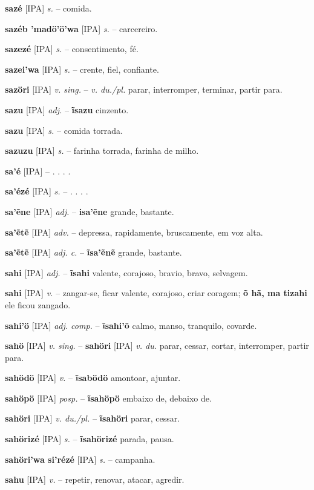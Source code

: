 \textbf{sazé} [IPA] \textit{s.} -- comida.

\textbf{sazéb 'madö'ö'wa} [IPA] \textit{s.} -- carcereiro.

\textbf{sazezé} [IPA] \textit{s.} -- consentimento, fé.

\textbf{sazei'wa} [IPA] \textit{s.} -- crente, fiel, confiante.

\textbf{sazöri} [IPA] \textit{v. sing.} -- \textit{v. du./pl.} parar, interromper, terminar, partir para.

\textbf{sazu} [IPA] \textit{adj.} -- \textbf{ĩsazu} cinzento.

\textbf{sazu} [IPA] \textit{s.} -- comida torrada.

\textbf{sazuzu} [IPA] \textit{s.} -- farinha torrada, farinha de milho.

\textbf{sa'é} [IPA] \textit{} -- . . . .

\textbf{sa'ézé} [IPA] \textit{s.} -- . . . .

\textbf{sa'ẽne} [IPA] \textit{adj.} -- \textbf{isa'ẽne} grande, bastante.

\textbf{sa'ẽtẽ} [IPA] \textit{adv.} -- depressa, rapidamente, bruscamente, em voz alta.

\textbf{sa'ẽtẽ} [IPA] \textit{adj. c.} -- \textbf{ĩsa'ẽnẽ} grande, bastante.

\textbf{sahi} [IPA] \textit{adj.} -- \textbf{ĩsahi} valente, corajoso, bravio, bravo, selvagem.

\textbf{sahi} [IPA] \textit{v.} -- zangar-se, ficar valente, corajoso, criar coragem; \textbf{õ hã, ma tizahi} ele ficou zangado.

\textbf{sahi'ö} [IPA] \textit{adj. comp.} -- \textbf{ĩsahi'õ} calmo, manso, tranquilo, covarde.

\textbf{sahö} [IPA] \textit{v. sing.} -- \textbf{sahöri} [IPA] \textit{v. du.} parar, cessar, cortar, interromper, partir para.

\textbf{sahödö} [IPA] \textit{v.} -- \textbf{ĩsabödö} amontoar, ajuntar.

\textbf{sahöpö} [IPA] \textit{posp.} -- \textbf{ĩsahöpö} embaixo de, debaixo de.

\textbf{sahöri} [IPA] \textit{v. du./pl.} -- \textbf{ĩsahöri} parar, cessar.

\textbf{sahörizé} [IPA] \textit{s.} -- \textbf{ĩsahörizé} parada, pausa.

\textbf{sahöri'wa si'rézé} [IPA] \textit{s.} -- campanha.

\textbf{sahu} [IPA] \textit{v.} -- repetir, renovar, atacar, agredir.

